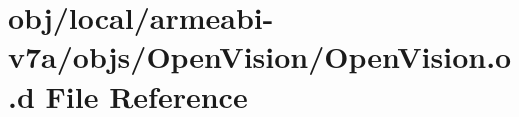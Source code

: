 \hypertarget{v7a_2objs_2_open_vision_2_open_vision_8o_8d}{\section{obj/local/armeabi-\/v7a/objs/\-Open\-Vision/\-Open\-Vision.o.\-d \-File \-Reference}
\label{v7a_2objs_2_open_vision_2_open_vision_8o_8d}
}
